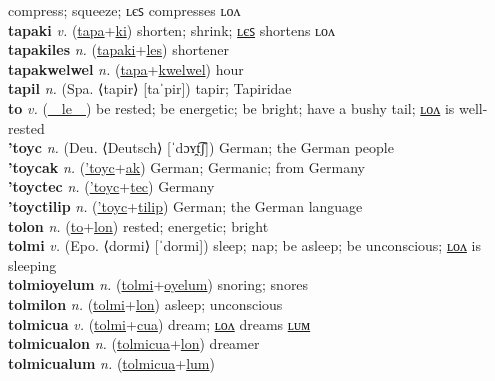 compress; squeeze; ʟєꜱ compresses ʟᴏᴧ \label{tapafuloki} \\
\textbf{tapaki} \textit{v.} (\hyperref[tapa]{tapa}+\hyperref[ki]{ki})
shorten; shrink; \hyperref[tapakiles]{ʟєꜱ} shortens ʟᴏᴧ \label{tapaki} \\
\textbf{tapakiles} \textit{n.} (\hyperref[tapaki]{tapaki}+\hyperref[les]{les})
shortener \label{tapakiles} \\
\textbf{tapakwelwel} \textit{n.} (\hyperref[tapa]{tapa}+\hyperref[kwelwel]{kwelwel})
hour \label{tapakwelwel} \\
\textbf{tapil} \textit{n.} (Spa. ⟨tapir⟩ [taˈpir])
tapir; Tapiridae \label{tapil} \\
\textbf{to} \textit{v.} (\hyperref[le]{~~le~~})
be rested; be energetic; be bright; have a bushy tail; \hyperref[tolon]{ʟᴏᴧ} is well-rested \label{to} \\
\textbf{'toyc} \textit{n.} (Deu. ⟨Deutsch⟩ [ˈdɔʏ̯t͡ʃ])
German; the German people \label{'toyc} \\
\textbf{'toycak} \textit{n.} (\hyperref['toyc]{'toyc}+\hyperref[ak]{ak})
German; Germanic; from Germany \label{'toycak} \\
\textbf{'toyctec} \textit{n.} (\hyperref['toyc]{'toyc}+\hyperref[tec]{tec})
Germany \label{'toyctec} \\
\textbf{'toyctilip} \textit{n.} (\hyperref['toyc]{'toyc}+\hyperref[tilip]{tilip})
German; the German language \label{'toyctilip} \\
\textbf{tolon} \textit{n.} (\hyperref[to]{to}+\hyperref[lon]{lon})
rested; energetic; bright \label{tolon} \\
\textbf{tolmi} \textit{v.} (Epo. ⟨dormi⟩ [ˈdormi])
sleep; nap; be asleep; be unconscious; \hyperref[tolmilon]{ʟᴏᴧ} is sleeping \label{tolmi} \\
\textbf{tolmioyelum} \textit{n.} (\hyperref[tolmi]{tolmi}+\hyperref[oyelum]{oyelum})
snoring; snores \label{tolmioyelum} \\
\textbf{tolmilon} \textit{n.} (\hyperref[tolmi]{tolmi}+\hyperref[lon]{lon})
asleep; unconscious \label{tolmilon} \\
\textbf{tolmicua} \textit{v.} (\hyperref[tolmi]{tolmi}+\hyperref[cua]{cua})
dream; \hyperref[tolmicualon]{ʟᴏᴧ} dreams \hyperref[tolmicualum]{ʟᴜᴍ} \label{tolmicua} \\
\textbf{tolmicualon} \textit{n.} (\hyperref[tolmicua]{tolmicua}+\hyperref[lon]{lon})
dreamer \label{tolmicualon} \\
\textbf{tolmicualum} \textit{n.} (\hyperref[tolmicua]{tolmicua}+\hyperref[lum]{lum})
